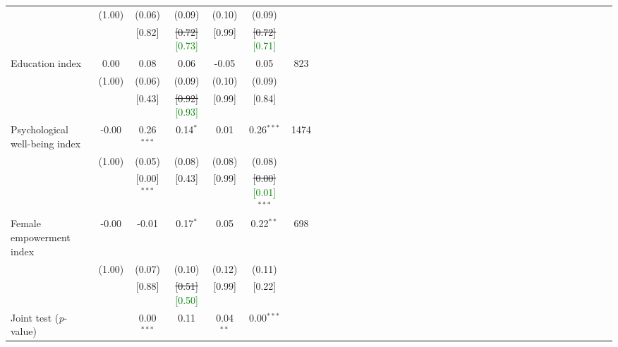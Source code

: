 {\begin{tabular}{l*{6}{SSSSSc}}
          &   (1.00)&   (0.06)&   (0.09)&   (0.10)&   (0.09)&         \\
          &         &   [0.82]&   \sout{[0.72]}\textcolor{green}{[0.73]}&   [0.99]&   \sout{[0.72]}\textcolor{green}{[0.71]}&         \\
Education index&     0.00&     0.08&     0.06&    -0.05&     0.05&      823\\
          &   (1.00)&   (0.06)&   (0.09)&   (0.10)&   (0.09)&         \\
          &         &   [0.43]&   \sout{[0.92]}\textcolor{green}{[0.93]}&   [0.99]&   [0.84]&         \\
Psychological well-being index&    -0.00&0.26$^{***}$&0.14$^{*}$&     0.01&0.26$^{***}$&     1474\\
          &   (1.00)&   (0.05)&   (0.08)&   (0.08)&   (0.08)&         \\
          &         &[0.00]$^{***}$&   [0.43]&   [0.99]&\sout{[0.00]}\textcolor{green}{[0.01]}$^{***}$&         \\
Female empowerment index&    -0.00&    -0.01&0.17$^{*}$&     0.05&0.22$^{**}$&      698\\
          &   (1.00)&   (0.07)&   (0.10)&   (0.12)&   (0.11)&         \\
          &         &   [0.88]&   \sout{[0.51]}\textcolor{green}{[0.50]}&   [0.99]&   [0.22]&         \\
\midrule Joint test (\emph{p}-value)&         &0.00$^{***}$&     0.11&0.04$^{**}$&0.00$^{***}$&         \\
\bottomrule
\end{tabular}
}
